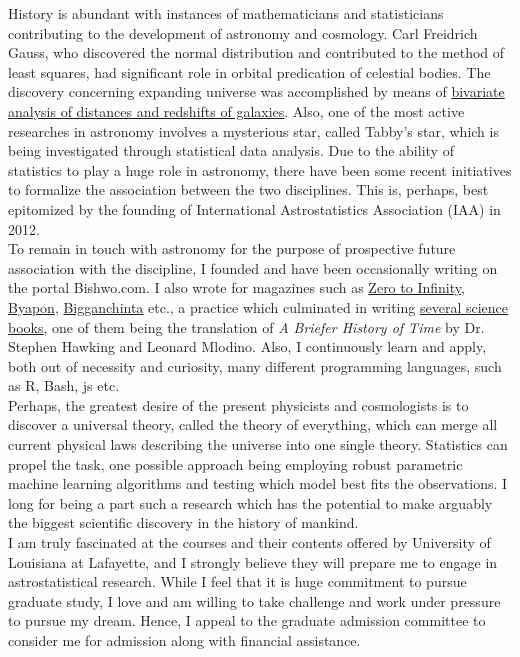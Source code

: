 \documentclass{article}
\newcommand{\statement}[1]{\par\medskip
  \underline{\textcolor{blue}{\textbf{#1:}}}\space
}
\begin{document}
History is abundant with instances of mathematicians and statisticians contributing to the development of astronomy and cosmology. Carl Freidrich Gauss, who discovered the normal distribution and contributed to the method of least squares, had significant role in orbital predication of celestial bodies. The discovery concerning expanding universe was accomplished by means of \href{https://www.pnas.org/content/pnas/15/3/168.full.pdf}{bivariate analysis of distances and redshifts of galaxies}. Also, one of the most active researches in astronomy involves a mysterious star, called Tabby's star, which is being investigated through statistical data analysis. Due to the ability of statistics to play a huge role in astronomy, there have been some recent initiatives to formalize the association between the two disciplines. This is, perhaps, best epitomized by the founding of International Astrostatistics Association (IAA) in 2012. \\

To remain in touch with astronomy for the purpose of prospective future association with the discipline, I founded and have been occasionally writing on the portal Bishwo.com. I also wrote for magazines such as \href{http://z2i.org}{Zero to Infinity}, \href{http://www.byapon.com}{Byapon}, \href{https://www.facebook.com/bigganchinta/}{Bigganchinta} etc., a practice which culminated in writing \href{https://mahmud.statmania.info/r\%C3\%A9sum\%C3\%A9.html#science-books}{several science books}, one of them being the translation of \textit{A Briefer History of Time} by Dr. Stephen Hawking and Leonard Mlodino. Also, I continuously learn and apply, both out of necessity and curiosity, many different programming languages, such as R, Bash, js etc.\\

Perhaps, the greatest desire of the present physicists and cosmologists is to discover a universal theory, called the theory of everything, which can merge all current physical laws describing the universe into one single theory. Statistics can propel the task, one possible approach being employing robust parametric machine learning algorithms and testing which model best fits the observations. I long for being a part such a research which has the potential to make arguably the biggest scientific discovery in the history of mankind. \\

I am truly fascinated at the courses and their contents offered by University of Louisiana at Lafayette, and I strongly believe they will prepare me to engage in astrostatistical research. While I feel that it is huge commitment to pursue graduate study, I love and am willing to take challenge and work under pressure to pursue my dream. Hence, I appeal to the graduate admission committee to consider me for admission along with financial assistance. 

\end{document}
